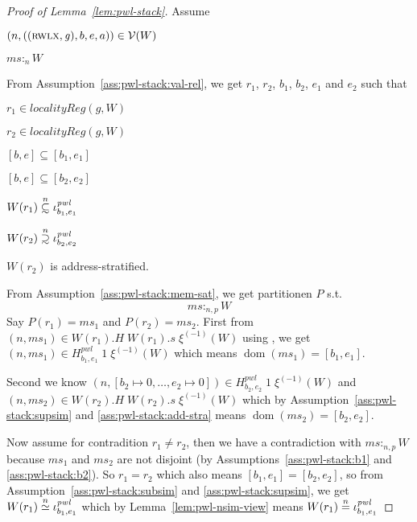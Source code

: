 \documentclass[a4paper]{article}
\newcommand{\nequal}[1][n]{\stackrel{\tiny{#1}}{=}}
\renewcommand{\nsim}[1][n]{\stackrel{\tiny{#1}}{\simeq}}
\newcommand\subsetsim{\mathrel{\ooalign{\raise.2ex\hbox{$\subset$}\cr
      \hidewidth\lower.8ex\hbox{\scalebox{0.9}{$\sim$}}\hidewidth\cr}}}
\newcommand\supsetsim{\mathrel{\ooalign{\raise.2ex\hbox{$\supset$}\cr
      \hidewidth\lower.8ex\hbox{\scalebox{0.9}{$\sim$}}\hidewidth\cr}}}
\newcommand{\nsubsim}[1][n]{\stackrel{\tiny{#1}}{\subsetsim}}
\newcommand{\nsupsim}[1][n]{\stackrel{\tiny{#1}}{\supsetsim}}
\DeclareMathOperator{\dom}{dom}
\newcommand{\var}[1]{\mathit{#1}}
\newcommand{\hs}{\var{ms}}
\newcommand{\ms}{\hs}
\newcommand{\gl}{\var{g}}
\newcommand{\heap}{\var{mem}}
\newcommand{\pwl}{\var{pwl}}
\newcommand{\heapSat}[3][\heap]{#1 :_{#2} #3}
\newcommand{\memSat}[3][n]{\heapSat[#2]{#1}{#3}}
\newcommand{\asmType}{\plaindom{AsmType}}
\newcommand{\plaindom}[1]{\mathrm{#1}}
\newcommand{\intr}[2]{\mathcal{#1}}
\newcommand{\valueintr}[1]{\intr{V}{#1}}
\newcommand{\stdvr}{\valueintr{\asmType}}
\newcommand{\npair}[2][n]{\left(#1,#2 \right)}
\newcommand{\plainperm}[1]{\textsc{#1}}
\newcommand{\rwlx}{\plainperm{rwlx}}
\newcommand{\localityReg}{\var{localityReg}}
\begin{document}
\begin{proof}[Proof of Lemma~\ref{lem:pwl-stack}]
  Assume
  \begin{enumproof}
    \item $\npair{((\rwlx, \gl),b,e,a)} \in \stdvr(W)$ \label{ass:pwl-stack:val-rel}
    \item $\memSat{\ms}{W}$ \label{ass:pwl-stack:mem-sat}
  \end{enumproof}
  From Assumption~\ref{ass:pwl-stack:val-rel}, we get $r_1$, $r_2$, $b_1$, $b_2$, $e_1$ and $e_2$ such that
  \begin{enumproof}[resume]
    \item $r_1 \in \localityReg(\gl,W)$
    \item $r_2 \in \localityReg(\gl,W)$
    \item $[b,e] \subseteq [b_1,e_1]$\label{ass:pwl-stack:b1}
    \item $[b,e] \subseteq [b_2,e_2]$ \label{ass:pwl-stack:b2}
    \item $W(r_1) \nsubsim \iota^\pwl_{b_1,e_1}$ \label{ass:pwl-stack:subsim}
    \item $W(r_2) \nsupsim \iota^\pwl_{b_2,e_2}$ \label{ass:pwl-stack:supsim}
    \item $W(r_2)$ is address-stratified. \label{ass:pwl-stack:add-stra}
  \end{enumproof}
From Assumption~\ref{ass:pwl-stack:mem-sat}, we get partitionen $P$ s.t.
\[
  \memSat[n,p]{\ms}{W}
\]
Say $P(r_1) = \ms_1$ and $P(r_2) = \ms_2$. First from $\npair{\ms_1} \in W(r_1).H\;W(r_1).s\;\xi^{(-1)}(W)$ using \label{ass:pwl-stack:subsim}, we get $\npair{\ms_1} \in H^\pwl_{b_1,e_1}\;1\;\xi^{(-1)}(W)$ which means $\dom(\ms_1) = [b_1,e_1]$.

Second we know $\npair{[b_2 \mapsto 0, \dots , e_2 \mapsto 0]} \in H^\pwl_{b_2,e_2}\;1\;\xi^{(-1)}(W)$ and $\npair{\ms_2} \in W(r_2).H\;W(r_2).s\;\xi^{(-1)}(W)$ which by Assumption~\ref{ass:pwl-stack:supsim} and \ref{ass:pwl-stack:add-stra} means $\dom(\ms_2) = [b_2,e_2]$.

Now assume for contradition $r_1 \neq r_2$, then we have a contradiction with $\memSat[n,p]{\ms}{W}$ because $\ms_1$ and $\ms_2$ are not disjoint (by Assumptions~\ref{ass:pwl-stack:b1} and \ref{ass:pwl-stack:b2}). So $r_1=r_2$ which also means $[b_1,e_1] = [b_2,e_2]$, so from Assumption~\ref{ass:pwl-stack:subsim} and \ref{ass:pwl-stack:supsim}, we get $W(r_1) \nsim \iota^\pwl_{b_1,e_1}$ which by Lemma~\ref{lem:pwl-nsim-view} means $W(r_1) \nequal \iota^\pwl_{b_1,e_1}$
\end{proof}
\end{document}
